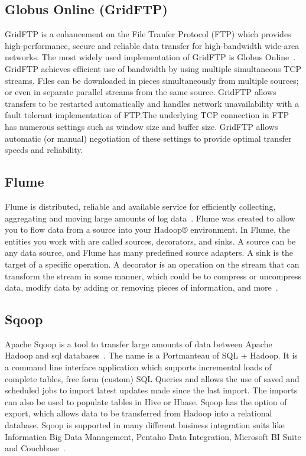     \pv

\subsection{Globus Online (GridFTP)}

GridFTP is a enhancement on the File Tranfer Protocol (FTP) which
provides high-performance, secure and reliable data transfer for
high-bandwidth wide-area networks. The most widely used implementation
of GridFTP is Globus Online~\cite{www-GlobusOnline}. GridFTP achieves
efficient use of bandwidth by using multiple simultaneous TCP streams.
Files can be downloaded in pieces simultaneously from multiple
sources; or even in separate parallel streams from the same
source. GridFTP allows transfers to be restarted automatically and
handles network unavailability with a fault tolerant implementation of
FTP.The underlying TCP connection in FTP has numerous settings such as
window size and buffer size. GridFTP allows automatic (or manual)
negotiation of these settings to provide optimal transfer speeds and
reliability.

     \pv


\subsection{Flume}

Flume is distributed, reliable and available service for efficiently
collecting, aggregating and moving large amounts of log
data~\cite{apache-flume}. Flume was created to allow you to flow data
from a source into your Hadoop® environment.  In Flume, the entities
you work with are called sources, decorators, and sinks. A source can
be any data source, and Flume has many predefined source adapters. A
sink is the target of a specific operation. A decorator is an
operation on the stream that can transform the stream in some manner,
which could be to compress or uncompress data, modify data by adding
or removing pieces of information, and more~\cite{ibm-flume}.

\subsection{Sqoop}
     
Apache Sqoop is a tool to transfer large amounts of data between
Apache Hadoop and sql databases~\cite{www-sqoop}. The name is a
Portmanteau of SQL + Hadoop. It is a command line interface
application which supports incremental loads of complete tables, free
form (custom) SQL Queries and allows the use of saved and scheduled
jobs to import latest updates made since the last import. The imports
can also be used to populate tables in Hive or Hbase. Sqoop has the
option of export, which allows data to be transferred from Hadoop into
a relational database. Sqoop is supported in many different business
integration suits like Informatica Big Data Management, Pentaho Data
Integration, Microsoft BI Suite and Couchbase~\cite{sqoop-wiki}.

